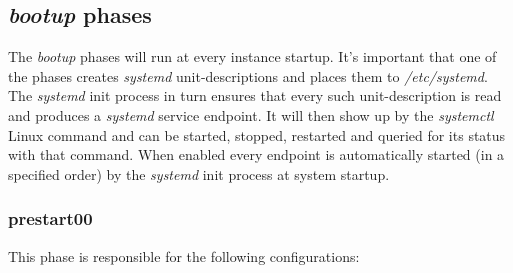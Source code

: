 		\subsection{\emph{bootup} phases}
			The \emph{bootup} phases will run at every instance startup. It's important that one of the phases creates \emph{systemd} unit-descriptions and places them to \emph{/etc/systemd}. The \emph{systemd} init process in turn ensures that every such unit-description is read and produces a \emph{systemd} service endpoint. It will then show up by the \emph{systemctl} Linux command and can be started, stopped, restarted and queried for its status with that command. When enabled every endpoint is automatically started (in a specified order) by the \emph{systemd} init process at system startup.
			\subsubsection{prestart00}
			This phase is responsible for the following configurations:
